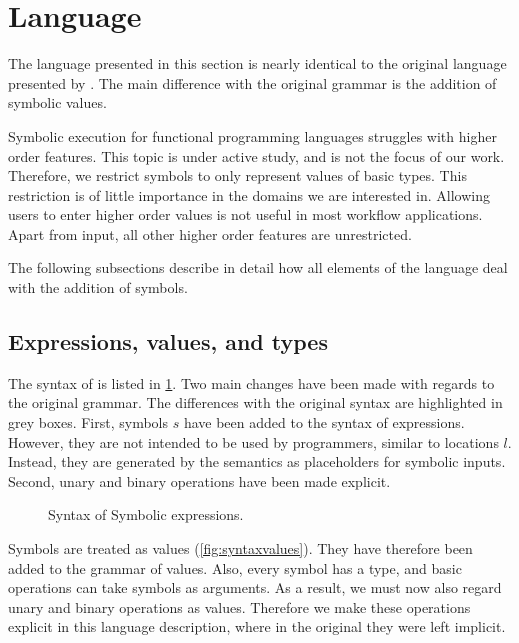 
\section{Language}
\label{sec:language}

The language presented in this section is nearly identical to the original \TOPHAT language presented by \citet{Steenvoorden2019}.
The main difference with the original grammar is the addition of symbolic values.

Symbolic execution for functional programming languages struggles with higher order features.
This topic is under active study, and is not the focus of our work.
Therefore, we restrict symbols to only represent values of basic types.
This restriction is of little importance in the domains we are interested in.
Allowing users to enter higher order values is not useful in most workflow applications.
Apart from input, all other higher order features are unrestricted.

The following subsections describe in detail how all elements of the \TOPHAT language deal with the addition of symbols.



\subsection{Expressions, values, and types}
\label{sec:expressions}

The syntax of \TOPHAT is listed in \cref{fig:syntaxtophat}.
Two main changes have been made with regards to the original \TOPHAT grammar.
The differences with the original syntax are highlighted in grey boxes.
First, symbols $s$ have been added to the syntax of expressions.
However, they are not intended to be used by programmers, similar to locations $l$.
Instead, they are generated by the semantics as placeholders for symbolic inputs.
Second, unary and binary operations have been made explicit.

\begin{figure}[ht]
  \small
  \caption{Syntax of Symbolic \TOPHAT expressions.}
  \label{fig:syntaxtophat}
\end{figure}

Symbols are treated as values (\cref{fig:syntaxvalues}).
They have therefore been added to the grammar of values.
Also, every symbol has a type, and basic operations can take symbols as arguments.
As a result, we must now also regard unary and binary operations as values.
Therefore we make these operations explicit in this language description,
where in the original they were left implicit.

